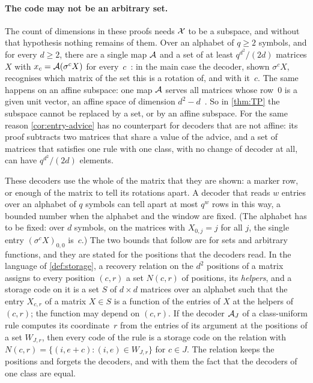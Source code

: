 \paragraph{The code may not be an arbitrary set.} The count of dimensions in these proofs needs $\mathcal{X}$ to be a subspace,
and without that hypothesis nothing remains of them. Over an alphabet of $q\ge2$ symbols, and for every $d\ge2$, there
are a single map $\mathcal{A}$ and a set of at least $q^{d^2}/(2d)$ matrices $X$ with $x_c=\mathcal{A}(\sigma^cX)$ for
every~$c$~\cite[Theorem~A.1 and Corollary~A.2]{SharedDecoders2026}: in the main case the decoder, shown
$\sigma^cX$, recognises which matrix of the set this is a rotation of, and with it~$c$. The same happens on an affine subspace: one map $\mathcal{A}$ serves
all matrices whose row~$0$ is a given unit vector, an affine space of dimension
$d^2-d$~\cite[Proposition~4.5]{SharedDecoders2026}. So in \cref{thm:TP} the subspace cannot be replaced by a set, or by
an affine subspace. For the same reason \cref{cor:entry-advice} has no counterpart for decoders that are not affine:
its proof subtracts two matrices that share a value of the advice, and a set of matrices that satisfies one rule with
one class, with no change of decoder at all, can have $q^{d^2}/(2d)$ elements.

These decoders use the whole of the matrix that they are shown: a marker row, or enough of the matrix to tell its
rotations apart. A decoder that reads $w$ entries over an alphabet of $q$ symbols can tell apart at most $q^w$ rows in
this way, a bounded number when the alphabet and the window are fixed. (The alphabet has to be fixed: over $d$
symbols, on the matrices with $X_{0,j}=j$ for all $j$, the single entry $(\sigma^cX)_{0,0}$ is~$c$.) The two bounds
that follow are for sets and arbitrary functions, and they are stated for the positions that the decoders read. In the
language of \cref{def:storage}, a recovery relation on the $d^2$ positions of a matrix assigns to every position
$(c,r)$ a set $N(c,r)$ of positions, its \emph{helpers}, and a storage code on it is a set $S$ of $d\times d$ matrices
over an alphabet such that the entry $X_{c,r}$ of a matrix $X\in S$ is a function of the entries of $X$ at the helpers
of $(c,r)$; the function may depend on $(c,r)$. If the decoder $\mathcal{A}_J$ of a class-uniform rule computes its
coordinate~$r$ from the entries of its argument at the positions of a set $W_{J,r}$, then every code of the rule is a
storage code on the relation with $N(c,r)=\{(i,e+c):(i,e)\in W_{J,r}\}$ for $c\in J$. The relation keeps the positions
and forgets the decoders, and with them the fact that the decoders of one class are equal.

